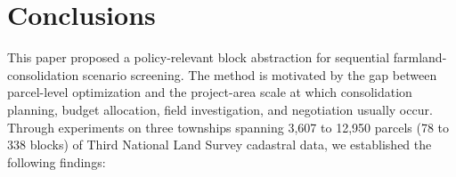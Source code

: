 \documentclass[preprint,12pt]{elsarticle}
\begin{document}
\section{Conclusions}
\label{sec:conclusions}

This paper proposed a policy-relevant block abstraction for sequential farmland-consolidation scenario screening. The method is motivated by the gap between parcel-level optimization and the project-area scale at which consolidation planning, budget allocation, field investigation, and negotiation usually occur. Through experiments on three townships spanning 3{,}607 to 12{,}950 parcels (78 to 338 blocks) of Third National Land Survey cadastral data, we established the following findings:
\end{document}
